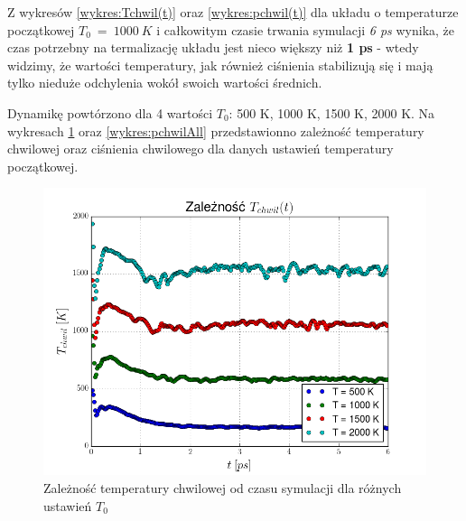 \documentclass[10]{article}
\begin{document}
Z wykresów \ref{wykres:Tchwil(t)} oraz \ref{wykres:pchwil(t)} dla układu o temperaturze początkowej $T_0 ~=~1000~ K$ i całkowitym czasie trwania symulacji \textit{6 ps} wynika, że czas potrzebny na termalizację układu jest nieco większy niż \textbf{1 ps} - wtedy widzimy, że wartości temperatury, jak również ciśnienia stabilizują się i mają tylko nieduże odchylenia wokół swoich wartości średnich.

Dynamikę powtórzono dla 4 wartości $T_0$: 500 K, 1000 K, 1500 K, 2000 K. Na wykresach \ref{wykres:TchwilAll} oraz \ref{wykres:pchwilAll} przedstawionno zależność temperatury chwilowej oraz ciśnienia chwilowego dla danych ustawień temperatury początkowej.

\begin{figure}[H]
\begin{center}
\includegraphics[scale=0.6]{chwiloweT.png}
\caption{Zależność temperatury chwilowej od czasu symulacji dla różnych ustawień $T_0$} \label{wykres:TchwilAll}\end{center}
\end{figure}
\end{document}
